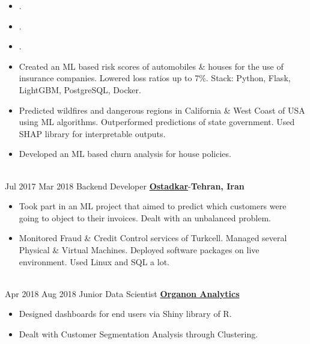 \documentclass[letterpaper]{DS_class_file} %
\begin{document}
\begin{twenty}
{\begin{itemize}
                \item .
                \item .
                \item .
			\item Created an ML based risk scores of automobiles \& houses for the use of insurance companies. Lowered loss ratios up to 7\%. \newline Stack: Python, Flask, LightGBM, PostgreSQL, Docker.
			\item Predicted wildfires and dangerous regions in California \& West Coast of USA using ML algorithms. Outperformed predictions of state government. Used SHAP library for interpretable outputs.
			\item Developed an ML based churn analysis for house policies.
		\end{itemize}}
		\\
	\twentyitem
		{Jul 2017}
		{Mar 2018}
		{\hspace{0.3cm}Backend Developer}
		{\href{https://www.linkedin.com/company/ostadkar/about/}{\textbf{Ostadkar}}-\textbf{Tehran, Iran}}
		{}
		{\begin{itemize}
			\item Took part in an ML project that aimed to predict which customers were going to object to their invoices. Dealt with an unbalanced problem.
			\item Monitored Fraud \& Credit Control services of Turkcell. Managed several Physical \& Virtual Machines. Deployed software packages on live environment. Used Linux and SQL a lot.
		\end{itemize}}
		\\
	\twentyitem
		{Apr 2018}
		{Aug 2018}
		{\hspace{0.3cm}Junior Data Scientist}
		{\href{http://www.organonanalytics.com/pages/index.php}{\textbf{Organon Analytics}}}
		{}
		{\begin{itemize}
			\item Designed dashboards for end users via Shiny library of R.
			\item Dealt with Customer Segmentation Analysis through Clustering.
		\end{itemize}}
		\\
\end{twenty}
\end{document}
